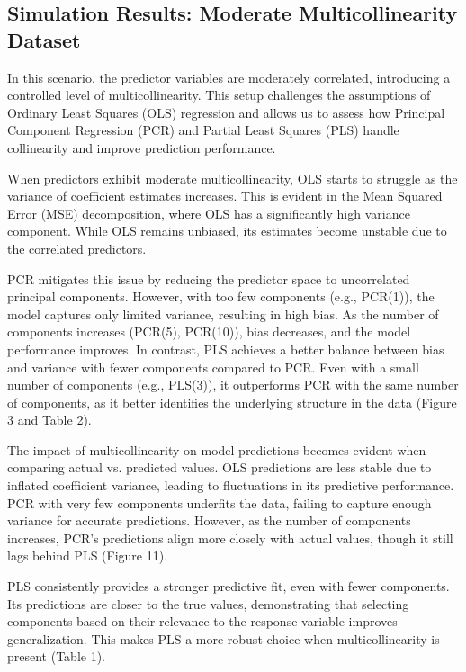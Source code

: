 \documentclass[11pt,twoside,a4paper]{article}
\begin{document}
\subsection{Simulation Results: Moderate Multicollinearity Dataset}  

In this scenario, the predictor variables are moderately correlated, introducing a controlled level of multicollinearity. This setup challenges the assumptions of Ordinary Least Squares (OLS) regression and allows us to assess how Principal Component Regression (PCR) and Partial Least Squares (PLS) handle collinearity and improve prediction performance.

When predictors exhibit moderate multicollinearity, OLS starts to struggle as the variance of coefficient estimates increases. This is evident in the Mean Squared Error (MSE) decomposition, where OLS has a significantly high variance component. While OLS remains unbiased, its estimates become unstable due to the correlated predictors.

PCR mitigates this issue by reducing the predictor space to uncorrelated principal components. However, with too few components (e.g., PCR(1)), the model captures only limited variance, resulting in high bias. As the number of components increases (PCR(5), PCR(10)), bias decreases, and the model performance improves. In contrast, PLS achieves a better balance between bias and variance with fewer components compared to PCR. Even with a small number of components (e.g., PLS(3)), it outperforms PCR with the same number of components, as it better identifies the underlying structure in the data (Figure 3 and Table 2).

The impact of multicollinearity on model predictions becomes evident when comparing actual vs. predicted values. OLS predictions are less stable due to inflated coefficient variance, leading to fluctuations in its predictive performance. PCR with very few components underfits the data, failing to capture enough variance for accurate predictions. However, as the number of components increases, PCR’s predictions align more closely with actual values, though it still lags behind PLS (Figure 11).

PLS consistently provides a stronger predictive fit, even with fewer components. Its predictions are closer to the true values, demonstrating that selecting components based on their relevance to the response variable improves generalization. This makes PLS a more robust choice when multicollinearity is present (Table 1).
\end{document}

